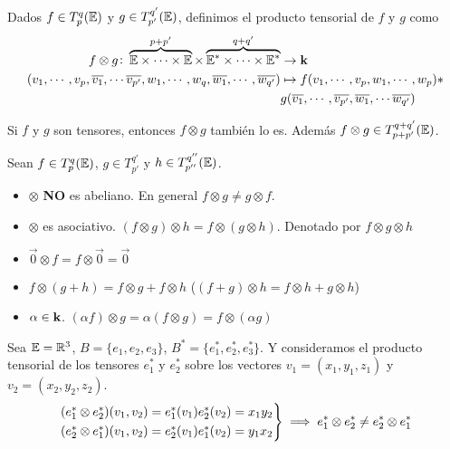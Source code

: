 \begin{defi}
	Dados $f \in T_p^q(\mathbb{E})$ y $g \in T_{p'}^{q'}(\mathbb{E})$, definimos el producto
	tensorial de $f$ y $g$ como
	\[
		\begin{aligned}
			f \otimes g \colon \overbrace{\mathbb{E} \times \cdots \times \mathbb{E}}^{p+p'}
			\times \overbrace{\mathbb{E}^* \times \cdots \times \mathbb{E}^*}^{q+q'} &\to \mathbf{k} \\
			(v_1, \cdots, v_p, \overline{v_1}, \cdots \overline{v_{p'}},
			w_1, \cdots, w_q, \overline{w_1}, \cdots, \overline{w_{q'}})
			&\mapsto f(v_1, \cdots, v_p, w_1, \cdots, w_p) * \\
			&g(\overline{v_1}, \cdots, \overline{v_{p'}}, \overline{w_1}, \cdots
			\overline{w_{q'}})
		\end{aligned}
	\]
\end{defi}
\begin{obs}
	Si $f$ y $g$ son tensores, entonces $f \otimes g$ también lo es. Además
	$f \otimes g \in T_{p+p'}^{q+q'}(\mathbb{E})$.
\end{obs}
\begin{prop}
	Sean  $f \in T_p^q(\mathbb{E})$, $g \in T_{p'}^{q'}$ y $h \in T_{p''}^{q''}(\mathbb{E})$.
	\begin{itemize}
		\item $\otimes$ {\bfseries NO} es abeliano. En general $f \otimes g \neq
		g \otimes f$.
		\item $\otimes$ es asociativo. $(f \otimes g) \otimes h = f \otimes (g
		\otimes h)$. Denotado por $f \otimes g \otimes h$
		\item $\vec{0} \otimes f = f \otimes \vec{0} = \vec{0}$
		\item $f \otimes (g + h) = f \otimes g + f\otimes h$ \quad ($(f+g) \otimes
		h = f \otimes h + g \otimes h$)
		\item $\alpha \in \mathbf{k}$. $(\alpha f) \otimes g = \alpha(f \otimes g) =
		f \otimes (\alpha g)$
	\end{itemize}
\end{prop}
\begin{example}
	Sea $\mathbb{E} = \mathbb{R}^3$, $B = \{e_1, e_2, e_3\}$, $B^* = \{ e_1^*, e_2^*, e_3^*\}$.
	Y consideramos el producto tensorial de los tensores $e_1^*$ y $e_2^*$ sobre
	los vectores $v_1 = (x_1, y_1, z_1)$ y $v_2 = (x_2,y_2,z_2)$.
	\[
		\begin{rcases}
			(e_1^* \otimes e_2^*)(v_1, v_2) = e_1^*(v_1)e_2^*(v_2) = x_1y_2 \\
			(e_2^* \otimes e_1^*)(v_1, v_2) = e_2^*(v_1)e_1^*(v_2) = y_1x_2
		\end{rcases}
		\implies e_1^* \otimes e_2^* \neq e_2^* \otimes e_1^*
	\]
\end{example}
